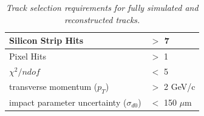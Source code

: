 \documentclass{cmspaper}
\begin{document}



 


\begin{table} [th]
\begin{center}
 \caption{\it \label{TrackSelection} Track selection requirements for fully simulated and reconstructed tracks.}
\vspace{0.5cm}
\begin{tabular}{|l|l|} \hline
Silicon Strip Hits                            &  $>$ 7          \\ \hline
Pixel Hits                                    &  $>$ 1          \\ \hline
$\chi^2/ndof$                                 &  $<$ 5          \\ \hline
transverse momentum ($p_T$)                   &  $>$ 2 GeV/c    \\ \hline
impact parameter uncertainty  ($\sigma_{d0}$) &  $<$ 150 $\mu$m \\ \hline
 \end{tabular}

 \end{center}
\end{table}




%
\end{document}
